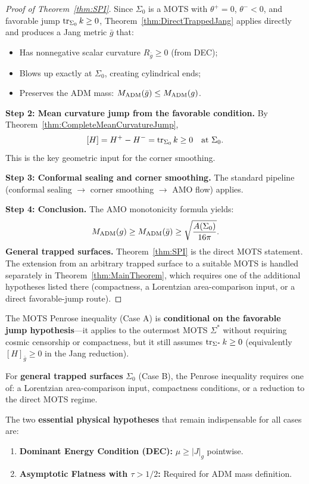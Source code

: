 \begin{proof}[Proof of Theorem~\ref{thm:SPI}]
Since $\Sigma_0$ is a MOTS with $\theta^+=0$, $\theta^-<0$, and favorable jump $\operatorname{tr}_{\Sigma_0}k\ge0$, Theorem~\ref{thm:DirectTrappedJang} applies directly and produces a Jang metric $\bar{g}$ that:
\begin{itemize}
    \item Has nonnegative scalar curvature $R_{\bar{g}} \ge 0$ (from DEC);
    \item Blows up exactly at $\Sigma_0$, creating cylindrical ends;
    \item Preserves the ADM mass: $M_{\mathrm{ADM}}(\bar{g}) \le M_{\mathrm{ADM}}(g)$.
\end{itemize}

\textbf{Step 2: Mean curvature jump from the favorable condition.}
By Theorem~\ref{thm:CompleteMeanCurvatureJump},
\[
    [H] = H^+ - H^- = \operatorname{tr}_{\Sigma_0}k \ge 0 \quad \text{at } \Sigma_0.
\]
This is the key geometric input for the corner smoothing.

\textbf{Step 3: Conformal sealing and corner smoothing.}
The standard pipeline (conformal sealing $\to$ corner smoothing $\to$ AMO flow) applies.

\textbf{Step 4: Conclusion.}
The AMO monotonicity formula yields:
\[
    M_{\mathrm{ADM}}(g) \ge M_{\mathrm{ADM}}(\bar{g}) \ge \sqrt{\frac{A(\Sigma_0)}{16\pi}}.
\]
\textbf{General trapped surfaces.}
Theorem~\ref{thm:SPI} is the direct MOTS statement. The extension from an arbitrary trapped surface to a suitable MOTS is handled separately in Theorem~\ref{thm:MainTheorem}, which requires one of the additional hypotheses listed there (compactness, a Lorentzian area-comparison input, or a direct favorable-jump route).
\end{proof}

\begin{remark}
The MOTS Penrose inequality (Case A) is \textbf{conditional on the favorable jump hypothesis}---it applies to the outermost MOTS $\Sigma^*$ without requiring cosmic censorship or compactness, but it still assumes $\operatorname{tr}_{\Sigma^*} k \ge 0$ (equivalently $[H]_{\bar g}\ge0$ in the Jang reduction).

For \textbf{general trapped surfaces} $\Sigma_0$ (Case B), the Penrose inequality requires one of: a Lorentzian area-comparison input, compactness conditions, or a reduction to the direct MOTS regime.

The two \textbf{essential physical hypotheses} that remain indispensable for all cases are:
\begin{enumerate}
    \item[(P1)] \textbf{Dominant Energy Condition (DEC):} $\mu \ge |J|_g$ pointwise.
    \item[(P2)] \textbf{Asymptotic Flatness with $\tau > 1/2$:} Required for ADM mass definition.
\end{enumerate}
\end{remark}

